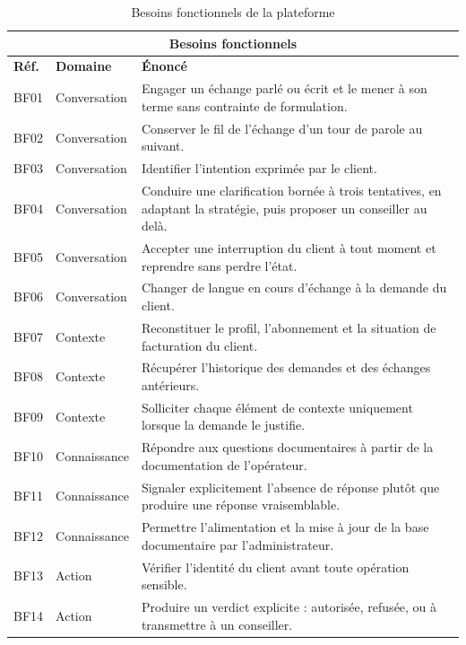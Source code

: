 \begin{table}[H]
\centering
\renewcommand{\arraystretch}{1.2}
\begin{tabular}{|p{1.3cm}|p{3.4cm}|p{9.2cm}|}
\hline
\multicolumn{3}{|c|}{\textbf{Besoins fonctionnels}} \\
\hline
\textbf{Réf.} & \textbf{Domaine} & \textbf{Énoncé} \\
\hline
BF01 & Conversation & Engager un échange parlé ou écrit et le mener à son terme sans contrainte de formulation. \\
\hline
BF02 & Conversation & Conserver le fil de l'échange d'un tour de parole au suivant. \\
\hline
BF03 & Conversation & Identifier l'intention exprimée par le client. \\
\hline
BF04 & Conversation & Conduire une clarification bornée à trois tentatives, en adaptant la stratégie, puis proposer un conseiller au delà. \\
\hline
BF05 & Conversation & Accepter une interruption du client à tout moment et reprendre sans perdre l'état. \\
\hline
BF06 & Conversation & Changer de langue en cours d'échange à la demande du client. \\
\hline
BF07 & Contexte & Reconstituer le profil, l'abonnement et la situation de facturation du client. \\
\hline
BF08 & Contexte & Récupérer l'historique des demandes et des échanges antérieurs. \\
\hline
BF09 & Contexte & Solliciter chaque élément de contexte uniquement lorsque la demande le justifie. \\
\hline
BF10 & Connaissance & Répondre aux questions documentaires à partir de la documentation de l'opérateur. \\
\hline
BF11 & Connaissance & Signaler explicitement l'absence de réponse plutôt que produire une réponse vraisemblable. \\
\hline
BF12 & Connaissance & Permettre l'alimentation et la mise à jour de la base documentaire par l'administrateur. \\
\hline
BF13 & Action & Vérifier l'identité du client avant toute opération sensible. \\
\hline
BF14 & Action & Produire un verdict explicite : autorisée, refusée, ou à transmettre à un conseiller. \\
\hline
\end{tabular}
\caption{Besoins fonctionnels de la plateforme}
\label{tab:bf}
\end{table}

